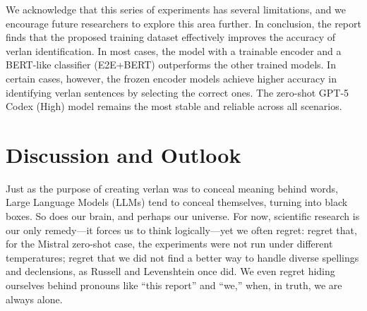 \documentclass[12pt]{article}
\begin{document}
We acknowledge that this series of experiments has several limitations, and we encourage future researchers to explore this area further. 
In conclusion, the report finds that the proposed training dataset effectively improves the accuracy of verlan identification. 
In most cases, the model with a trainable encoder and a BERT-like classifier (E2E+BERT) outperforms the other trained models. 
In certain cases, however, the frozen encoder models achieve higher accuracy in identifying verlan sentences by selecting the correct ones. 
The zero-shot GPT-5 Codex (High) model remains the most stable and reliable across all scenarios.

\section{Discussion and Outlook}

Just as the purpose of creating verlan was to conceal meaning behind words, Large Language Models (LLMs) tend to conceal themselves, turning into black boxes. 
So does our brain, and perhaps our universe. 
For now, scientific research is our only remedy\;---\;it forces us to think logically\;---\;yet we often regret: 
regret that, for the Mistral zero-shot case, the experiments were not run under different temperatures; 
regret that we did not find a better way to handle diverse spellings and declensions, as Russell and Levenshtein once did. 
We even regret hiding ourselves behind pronouns like ``this report'' and ``we,'' when, in truth, we are always alone. 
\end{document}
